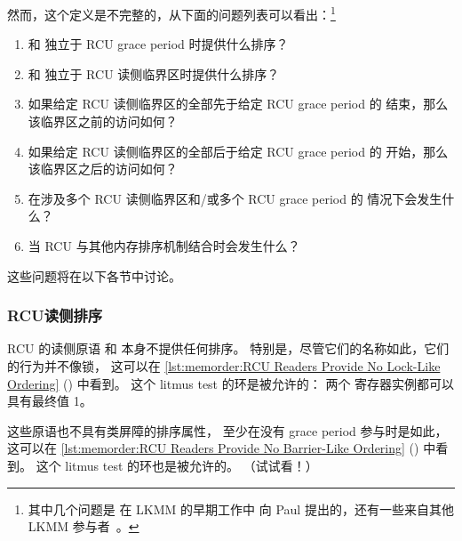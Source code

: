 然而，这个定义是不完整的，从下面的问题列表可以看出：\footnote{
	其中几个问题是  在 LKMM 的早期工作中
	向 Paul 提出的，还有一些来自其他
	LKMM 参与者~\cite{Alglave:2018:FSC:3173162.3177156}。}

\begin{enumerate}
\item	{} 和  独立于
	RCU grace period 时提供什么排序？
\item	{} 和 
	独立于 RCU 读侧临界区时提供什么排序？
\item	如果给定 RCU 读侧临界区的全部先于给定 RCU grace period 的
	结束，那么该临界区之前的访问如何？
\item	如果给定 RCU 读侧临界区的全部后于给定 RCU grace period 的
	开始，那么该临界区之后的访问如何？
\item	在涉及多个 RCU 读侧临界区和/或多个 RCU grace period 的
	情况下会发生什么？
\item	当 RCU 与其他内存排序机制结合时会发生什么？
\end{enumerate}

这些问题将在以下各节中讨论。

\subsubsection{RCU读侧排序}
\label{sec:memorder:RCU Read-Side Ordering}

RCU 的读侧原语  和
 本身不提供任何排序。
特别是，尽管它们的名称如此，它们的行为并不像锁，
这可以在
\cref{lst:memorder:RCU Readers Provide No Lock-Like Ordering}
() 中看到。
这个 litmus test 的环是被允许的：
两个  寄存器实例都可以具有最终值 1。

\begin{listing}

\caption{RCU读者不提供类锁排序}
\label{lst:memorder:RCU Readers Provide No Lock-Like Ordering}
\end{listing}

这些原语也不具有类屏障的排序属性，
至少在没有 grace period 参与时是如此，
这可以在 \cref{lst:memorder:RCU Readers Provide No Barrier-Like Ordering}
() 中看到。
这个 litmus test 的环也是被允许的。
（试试看！）

\begin{listing}

\caption{RCU读者不提供类Barrier排序}
\label{lst:memorder:RCU Readers Provide No Barrier-Like Ordering}
\end{listing}

